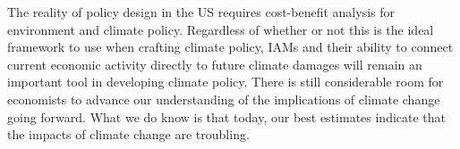 The reality of policy design in the US requires cost-benefit analysis for environment and climate policy. Regardless of whether or not this is the ideal framework to use when crafting climate policy, IAMs and their ability to connect current economic activity directly to future climate damages will remain an important tool in developing climate policy. There is still considerable room for economists to advance our understanding of the implications of climate change going forward. What we do know is that today, our best estimates indicate that the impacts of climate change are troubling. 




